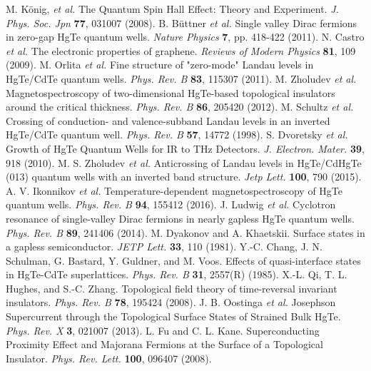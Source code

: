 \documentclass[titlepage,a4paper]{book}
\begin{document}
\begin{thebibliography}{199}
M. König, \textit{et al.} The Quantum Spin Hall Effect: Theory and Experiment. \textit{J. Phys. Soc. Jpn} \textbf{77}, 031007 (2008).
B. Büttner \textit{et al.} Single valley Dirac fermions in zero-gap HgTe quantum wells. \textit{Nature Physics} \textbf{7}, pp. 418-422 (2011).
N. Castro \textit{et al.} The electronic properties of graphene. \textit{Reviews of Modern Physics} \textbf{81}, 109 (2009).
M. Orlita \textit{et al.} Fine structure of "zero-mode" Landau levels in HgTe/CdTe quantum wells. \textit{Phys. Rev. B} \textbf{83}, 115307 (2011).
M. Zholudev \textit{et al.} Magnetospectroscopy of two-dimensional HgTe-based topological insulators around the critical thickness. \textit{Phys. Rev. B} \textbf{86}, 205420 (2012).
M. Schultz \textit{et al.} Crossing of conduction- and valence-subband Landau levels in an inverted HgTe/CdTe quantum well. \textit{Phys. Rev. B} \textbf{57}, 14772 (1998).
S. Dvoretsky \textit{et al.} Growth of HgTe Quantum Wells for IR to THz Detectors. \textit{J. Electron. Mater.} \textbf{39}, 918 (2010).
M. S. Zholudev \textit{et al.} Anticrossing of Landau levels in HgTe/CdHgTe (013) quantum wells with an inverted band structure. \textit{Jetp Lett.} \textbf{100}, 790 (2015).
A. V. Ikonnikov \textit{et al.} Temperature-dependent magnetospectroscopy of HgTe quantum wells. \textit{Phys. Rev. B} \textbf{94}, 155412 (2016).
J. Ludwig \textit{et al.} Cyclotron resonance of single-valley Dirac fermions in nearly gapless HgTe quantum wells. \textit{Phys. Rev. B} \textbf{89}, 241406 (2014).
M. Dyakonov and A. Khaetskii. Surface states in a gapless semiconductor. \textit{JETP Lett.} \textbf{33}, 110 (1981).
Y.-C. Chang, J. N. Schulman, G. Bastard, Y. Guldner, and M. Voos. Effects of quasi-interface states in HgTe-CdTe superlattices. \textit{Phys. Rev. B} \textbf{31}, 2557(R) (1985).
X.-L. Qi, T. L. Hughes, and S.-C. Zhang. Topological field theory of time-reversal invariant insulators. \textit{Phys. Rev. B} \textbf{78}, 195424 (2008).
J. B. Oostinga \textit{et al.} Josephson Supercurrent through the Topological Surface States of Strained Bulk HgTe. \textit{Phys. Rev. X} \textbf{3}, 021007 (2013).
L. Fu and C. L. Kane. Superconducting Proximity Effect and Majorana Fermions at the Surface of a Topological Insulator. \textit{Phys. Rev. Lett.} \textbf{100}, 096407 (2008).

\end{thebibliography}
\end{document}
